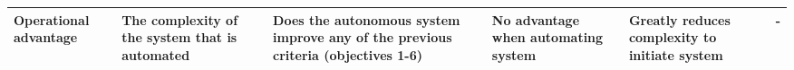 \begin{table}[H]
{\begin{tabular}{|p{2cm}|p{4cm}|p{4cm}|p{4cm}|p{4cm}|r|}
Operational advantage & The complexity of the system that is automated                                                                                                         & Does the autonomous system improve any of the previous criteria (objectives 1-6) & No advantage when automating system                            & Greatly reduces complexity to initiate system                                        & -                  \\ \hline
\end{tabular}%
}
\end{table}


\newepage